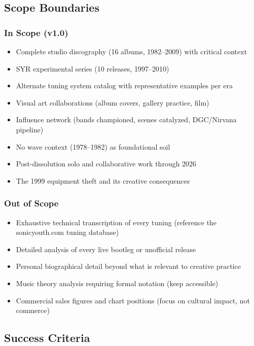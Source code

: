 \documentclass[11pt,letterpaper]{article}
\begin{document}
\subsection{Scope Boundaries}

\subsubsection{In Scope (v1.0)}

\begin{itemize}[leftmargin=2em]
\item Complete studio discography (16 albums, 1982--2009) with critical context
\item SYR experimental series (10 releases, 1997--2010)
\item Alternate tuning system catalog with representative examples per era
\item Visual art collaborations (album covers, gallery practice, film)
\item Influence network (bands championed, scenes catalyzed, DGC/Nirvana pipeline)
\item No wave context (1978--1982) as foundational soil
\item Post-dissolution solo and collaborative work through 2026
\item The 1999 equipment theft and its creative consequences
\end{itemize}

\subsubsection{Out of Scope}

\begin{itemize}[leftmargin=2em]
\item Exhaustive technical transcription of every tuning (reference the sonicyouth.com tuning database)
\item Detailed analysis of every live bootleg or unofficial release
\item Personal biographical detail beyond what is relevant to creative practice
\item Music theory analysis requiring formal notation (keep accessible)
\item Commercial sales figures and chart positions (focus on cultural impact, not commerce)
\end{itemize}

\subsection{Success Criteria}
\end{document}
